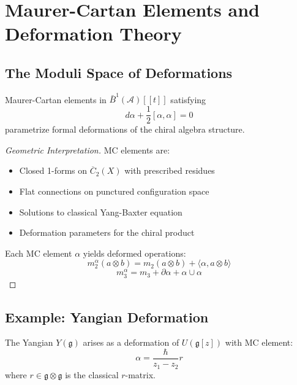 
\section{Maurer-Cartan Elements and Deformation Theory}

\subsection{The Moduli Space of Deformations}

\begin{theorem}[Maurer-Cartan = Deformations]
Maurer-Cartan elements in $\bar{B}^1(\mathcal{A})[[t]]$ satisfying
$$d\alpha + \frac{1}{2}[\alpha, \alpha] = 0$$
parametrize formal deformations of the chiral algebra structure.
\end{theorem}

\begin{proof}[Geometric Interpretation]
MC elements are:
\begin{itemize}
\item Closed 1-forms on $\overline{C}_2(X)$ with prescribed residues
\item Flat connections on punctured configuration space
\item Solutions to classical Yang-Baxter equation
\item Deformation parameters for the chiral product
\end{itemize}

Each MC element $\alpha$ yields deformed operations:
$$m_2^\alpha(a \otimes b) = m_2(a \otimes b) + \langle \alpha, a \otimes b \rangle$$
$$m_3^\alpha = m_3 + \partial\alpha + \alpha \cup \alpha$$
\end{proof}

\subsection{Example: Yangian Deformation}

\begin{theorem}
The Yangian $Y(\mathfrak{g})$ arises as a deformation of $U(\mathfrak{g}[z])$ with MC element:
$$\alpha = \frac{\hbar}{z_1 - z_2} r$$
where $r \in \mathfrak{g} \otimes \mathfrak{g}$ is the classical $r$-matrix.
\end{theorem}

